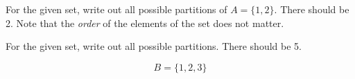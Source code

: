\documentclass[a4paper,12pt]{book}
\newcounter{question}
\begin{document}
        \begin{questionNOGRADE}{\thequestion}

            For the given set, write out all possible partitions of
            $ A = \{1, 2\} $.
            There should be 2. Note that the \textit{order} of the
            elements of the set does not matter.
            

        \end{questionNOGRADE}
    
    \newpage
    
        \begin{questionNOGRADE}{\thequestion}

            For the given set, write out all possible partitions.
            There should be 5.

            $$ B = \{1, 2, 3\} $$


        \end{questionNOGRADE}

        \hrulefill
\end{document}
